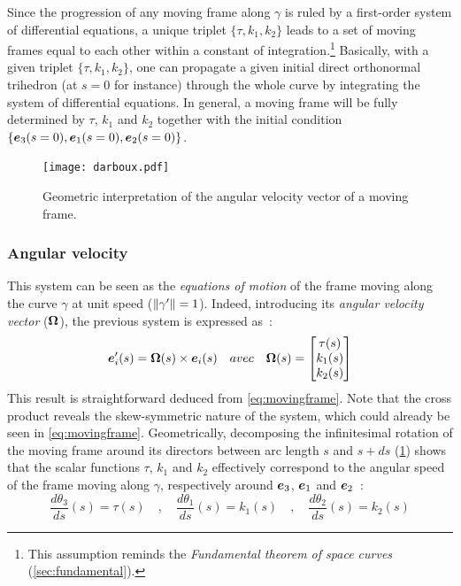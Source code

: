 Since the progression of any moving frame along $\gamma$ is ruled by a first-order system of differential equations, a unique triplet $\{\tau, k_{1}, k_{2}\}$ leads to a set of moving frames equal to each other within a constant of integration.\footnote{This assumption reminds the \emph{Fundamental theorem of space curves} (\cref{sec:fundamental}).} Basically, with a given triplet $\{\tau, k_{1}, k_{2}\}$, one can propagate a given initial direct orthonormal trihedron (at $s=0$ for instance) through the whole curve by integrating the system of differential equations. In general, a moving frame will be fully determined by $\tau$, $k_{1}$ and $k_{2}$ together with the initial condition $\{\boldsymbol{e}_{3}(s=0),\boldsymbol{e}_{1}(s=0),\boldsymbol{e}_{2}(s=0)\}$.

\begin{figure}[t]
\centering
\texttt{[image: darboux.pdf]}
\caption{Geometric interpretation of the angular velocity vector of a moving frame.}
\label{fig:3_4}
\end{figure}

\subsubsection{Angular velocity}
This system can be seen as the \emph{equations of motion} of the frame moving along the curve $\gamma$ at unit speed ($\lVert\gamma'\rVert=1$). Indeed, introducing its \emph{angular velocity vector} ($\boldsymbol{\Omega}$), the previous system is expressed as~:
\begin{equation}
	\boldsymbol{e}'_{i}(s) = \boldsymbol{\Omega}(s) \times \boldsymbol{e}_{i}(s)
	\quad avec \quad
	\boldsymbol{\Omega}(s)
	=
	\begin{bmatrix}
		\tau(s) \\
		k_1(s) \\
		k_2(s)
	\end{bmatrix}
\end{equation}
This result is straightforward deduced from \cref{eq:movingframe}. Note that the cross product reveals the skew-symmetric nature of the system, which could already be seen in \cref{eq:movingframe}.
Geometrically, decomposing the infinitesimal rotation of the moving frame around its directors between arc length $s$ and $s+ds$ (\cref{fig:3_4}) shows that the scalar functions $\tau$, $k_{1}$ and $k_{2}$ effectively correspond to the angular speed of the frame moving along $\gamma$, respectively around $\boldsymbol{e}_{3}$, $\boldsymbol{e}_{1}$ and $\boldsymbol{e}_{2}$~:
\begin{equation}
	\frac{d\theta_3}{ds}(s) = \tau(s)
	\quad,\quad
	\frac{d\theta_1}{ds}(s) = k_{1}(s)
	\quad,\quad
	\frac{d\theta_2}{ds}(s) = k_{2}(s)
\end{equation}

